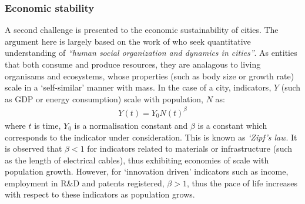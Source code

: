 \subsubsection*{Economic stability}
A second challenge is presented to the economic sustainability of cities. The argument here is largely based on the work of \citet{Bettencourt2007} who seek quantitative understanding of \emph{``human social organization and dynamics in cities''}. As entities that both consume and produce resources, they are analagous to living organisams and ecosystems, whose properties (such as body size or growth rate) scale in a `self-similar' manner with mass. In the case of a city, indicators, $Y$ (such as GDP or energy consumption) scale with population, $N$ as:
\begin{align} \label{eq:urban_scale}
	Y(t)=Y_0N(t)^{\beta}
\end{align}
where $t$ is time, $Y_0$ is a normalisation constant and $\beta$ is a constant which corresponds to the indicator under consideration. This is known as \emph{`Zipf's law}. It is observed that $\beta<1$ for indicators related to materials or infrastructure (such as the length of electrical cables), thus exhibiting economies of scale with population growth. However, for `innovation driven' indicators such as income, employment in R\&D and patents registered, $\beta>1$, thus the pace of life increases with respect to these indicators as population grows. %

